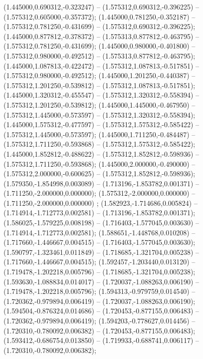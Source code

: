  (1.445000,0.690312,-0.323247) -- (1.575312,0.690312,-0.396225) -- (1.575312,0.605000,-0.357372);
 (1.445000,0.781250,-0.352187) -- (1.575312,0.781250,-0.431699) -- (1.575312,0.690312,-0.396225);
 (1.445000,0.877812,-0.378372) -- (1.575313,0.877812,-0.463795) -- (1.575312,0.781250,-0.431699);
 (1.445000,0.980000,-0.401800) -- (1.575312,0.980000,-0.492512) -- (1.575313,0.877812,-0.463795);
 (1.445000,1.087813,-0.422472) -- (1.575312,1.087813,-0.517851) -- (1.575312,0.980000,-0.492512);
 (1.445000,1.201250,-0.440387) -- (1.575312,1.201250,-0.539812) -- (1.575312,1.087813,-0.517851);
 (1.445000,1.320312,-0.455547) -- (1.575312,1.320312,-0.558394) -- (1.575312,1.201250,-0.539812);
 (1.445000,1.445000,-0.467950) -- (1.575312,1.445000,-0.573597) -- (1.575312,1.320312,-0.558394);
 (1.445000,1.575312,-0.477597) -- (1.575312,1.575312,-0.585422) -- (1.575312,1.445000,-0.573597);
 (1.445000,1.711250,-0.484487) -- (1.575312,1.711250,-0.593868) -- (1.575312,1.575312,-0.585422);
 (1.445000,1.852812,-0.488622) -- (1.575312,1.852812,-0.598936) -- (1.575312,1.711250,-0.593868);
 (1.445000,2.000000,-0.490000) -- (1.575312,2.000000,-0.600625) -- (1.575312,1.852812,-0.598936);
 (1.579350,-1.854998,0.003089) -- (1.713196,-1.853782,0.001371) -- (1.711250,-2.000000,0.000000);
 (1.575312,-2.000000,0.000000) -- (1.711250,-2.000000,0.000000) ;
 (1.582923,-1.714686,0.005824) -- (1.714914,-1.712773,0.002581) -- (1.713196,-1.853782,0.001371);
 (1.586025,-1.579225,0.008198) -- (1.716403,-1.577045,0.003630) -- (1.714914,-1.712773,0.002581);
 (1.588651,-1.448768,0.010208) -- (1.717660,-1.446667,0.004515) -- (1.716403,-1.577045,0.003630);
 (1.590797,-1.323461,0.011849) -- (1.718685,-1.321704,0.005238) -- (1.717660,-1.446667,0.004515);
 (1.592457,-1.203440,0.013120) -- (1.719478,-1.202218,0.005796) -- (1.718685,-1.321704,0.005238);
 (1.593630,-1.088834,0.014017) -- (1.720037,-1.088263,0.006190) -- (1.719478,-1.202218,0.005796);
 (1.594313,-0.979759,0.014540) -- (1.720362,-0.979894,0.006419) -- (1.720037,-1.088263,0.006190);
 (1.594504,-0.876324,0.014686) -- (1.720453,-0.877155,0.006483) -- (1.720362,-0.979894,0.006419);
 (1.594203,-0.778627,0.014456) -- (1.720310,-0.780092,0.006382) -- (1.720453,-0.877155,0.006483);
 (1.593412,-0.686754,0.013850) -- (1.719933,-0.688741,0.006117) -- (1.720310,-0.780092,0.006382);
